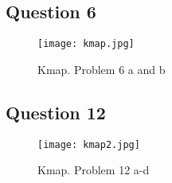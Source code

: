 \documentclass{article}
\begin{document}
\subsection*{Question 6}
\begin{figure}[h!]
\centering
\texttt{[image: kmap.jpg]}
\caption{Kmap. Problem 6 a and b}
\label{fig:kmap}
\end{figure}

\subsection*{Question 12}
\begin{figure}[h!]
\centering
\texttt{[image: kmap2.jpg]}
\caption{Kmap. Problem 12 a-d}
\label{fig:kmap2}
\end{figure}
\end{document}
